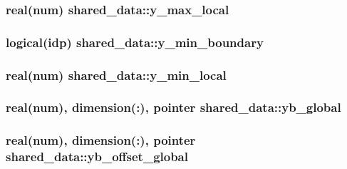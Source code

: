 \subsubsection[{\texorpdfstring{y\+\_\+max\+\_\+local}{y_max_local}}]{\setlength{\rightskip}{0pt plus 5cm}real(num) shared\+\_\+data\+::y\+\_\+max\+\_\+local}\hypertarget{namespaceshared__data_a0fb4b2d73929a142db79b38b0fdf8545}{}\label{namespaceshared__data_a0fb4b2d73929a142db79b38b0fdf8545}
\subsubsection[{\texorpdfstring{y\+\_\+min\+\_\+boundary}{y_min_boundary}}]{\setlength{\rightskip}{0pt plus 5cm}logical(idp) shared\+\_\+data\+::y\+\_\+min\+\_\+boundary}\hypertarget{namespaceshared__data_ac54278949a6918cd0e9ed158e4eadb52}{}\label{namespaceshared__data_ac54278949a6918cd0e9ed158e4eadb52}
\subsubsection[{\texorpdfstring{y\+\_\+min\+\_\+local}{y_min_local}}]{\setlength{\rightskip}{0pt plus 5cm}real(num) shared\+\_\+data\+::y\+\_\+min\+\_\+local}\hypertarget{namespaceshared__data_a3e7f4b2ead34c7eb9885b4b896127441}{}\label{namespaceshared__data_a3e7f4b2ead34c7eb9885b4b896127441}
\subsubsection[{\texorpdfstring{yb\+\_\+global}{yb_global}}]{\setlength{\rightskip}{0pt plus 5cm}real(num), dimension(\+:), pointer shared\+\_\+data\+::yb\+\_\+global}\hypertarget{namespaceshared__data_a5c47105c9e91eee415dcf5d99f2feffc}{}\label{namespaceshared__data_a5c47105c9e91eee415dcf5d99f2feffc}
\subsubsection[{\texorpdfstring{yb\+\_\+offset\+\_\+global}{yb_offset_global}}]{\setlength{\rightskip}{0pt plus 5cm}real(num), dimension(\+:), pointer shared\+\_\+data\+::yb\+\_\+offset\+\_\+global}\hypertarget{namespaceshared__data_a73076ccf0db0fc2938cfb670ead8e284}{}\label{namespaceshared__data_a73076ccf0db0fc2938cfb670ead8e284}
